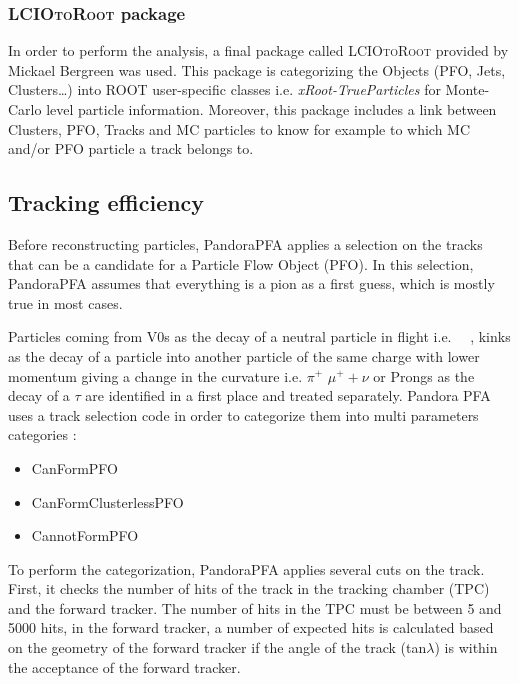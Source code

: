 \subsubsection{\textsc{LCIOtoRoot}\xspace package}

In order to perform the analysis, a final package called \textsc{LCIOtoRoot}\xspace provided by Mickael Bergreen was used. This package is categorizing the \lcio Objects (PFO, Jets, Clusters\ldots) into \textsc{ROOT}\xspace user-specific classes i.e. \textit{xRoot-TrueParticles} for Monte-Carlo level particle information. Moreover, this package includes a link between Clusters, PFO, Tracks and MC particles to know for example to which MC and/or PFO particle a track belongs to.

\subsection{Tracking efficiency}

Before reconstructing particles, PandoraPFA applies a selection on the tracks that can be a candidate for a Particle Flow Object (PFO). In this selection,
PandoraPFA assumes that everything is a pion as a first guess, which is mostly true in most cases. %

Particles coming from V0s as the decay of a neutral particle in flight i.e. \gam\ \ra\ \ee, kinks as the decay of a particle into another particle of the same charge with lower momentum giving a change in the curvature i.e. $\pi^+$ \ra $\mu^++\nu$ or Prongs as the decay of a $\tau$ are identified in a first place and treated separately.
Pandora PFA uses a track selection code in order to categorize them into multi parameters categories :

\begin{itemize}
  \item CanFormPFO
  \item CanFormClusterlessPFO
  \item CannotFormPFO
\end{itemize}

To perform the categorization, PandoraPFA applies several cuts on the track. First, it checks the number of hits of the track in the tracking chamber (TPC) and the forward tracker. The number of hits in the TPC must be between 5 and 5000 hits, in the forward tracker, a number of expected hits is calculated based on the geometry of the forward tracker if the angle of the track (tan$\lambda$) is within the acceptance of the forward tracker.

